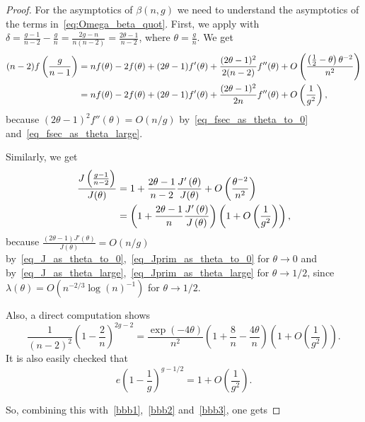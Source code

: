 \documentclass[a4paper,12pt]{article}
\theoremstyle{definition}
\newcommand{\f}[2]{f\left(\frac{#1}{#2}\right)}
\newcommand{\bigO}[1]{O\left({#1}\right)}
\newcommand{\halfminth}{\left(\frac 1 2 -\theta\right)}
\newcommand{\bigpar}[1]{\left({#1}\right)}
\begin{document}
\begin{proof}
For the asymptotics of $\beta(n,g)$ we need to understand the asymptotics of the terms in~\eqref{eq:Omega_beta_quot}. 
First, we apply  with $\delta=\frac{g-1}{n-2}-\frac{g}{n}=\frac{2g-n}{n(n-2)}=\frac{2\theta-1}{n-2}$, where $\theta=\frac{g}{n}$. We get
\begin{align}
(n-2)\f{g}{n-1}&=nf(\theta)-2f(\theta)+(2\theta-1)f'(\theta)+\frac{(2\theta-1)^2}{2(n-2)}f''(\theta)+\bigO{\frac{\halfminth\theta^{-2}}{n^2}}\notag\\
&=nf(\theta)-2f(\theta)+(2\theta-1)f'(\theta)+\frac{(2\theta-1)^2}{2n}f''(\theta)+\bigO{\frac{1}{g^2}},\label{bbb1}
\end{align}
because  $(2\theta-1)^2f''(\theta)=O(n/g)$ by~\eqref{eq_fsec_as_theta_to_0} and~\eqref{eq_fsec_as_theta_large}. 


Similarly, we get
\begin{align}
\frac{J\left(\frac{g-1}{n-2}\right)}{J(\theta)}&=1+\frac{2\theta-1}{n-2}\frac{J'\left(\theta\right)}{J(\theta)}+\bigO{\frac{\theta^{-2}}{n^2}}\notag\\
&=\bigpar{1+\frac{2\theta-1}{n}\frac{J'\left(\theta\right)}{J\left(\theta\right)}}\bigpar{1+\bigO{\frac{1}{g^2}}},\label{bbb2}
\end{align}
because  $\frac{(2\theta-1) J'(\theta)}{J(\theta)}=O(n/g)$ 
by~\eqref{eq_J_as_theta_to_0},~\eqref{eq_Jprim_as_theta_to_0} for $\theta\to 0$ and by~\eqref{eq_J_as_theta_large},~\eqref{eq_Jprim_as_theta_large} for $\theta\to1/2$, since
 $\lambda(\theta)=O(n^{-2/3} \log(n)^{-1})$ for $\theta\to1/2$.


Also, a direct computation shows
\begin{equation}\label{bbb3}
   \frac{1}{(n-2)^2}\left(1-\frac{2}{n}\right)^{2g-2}
   =\frac{\exp(-4\theta)}{n^2}\left(1+\frac{8}{n}-\frac{4\theta}{n}\right)\bigpar{1+\bigO{\frac{1}{g^2}}}.
\end{equation}
It is also easily checked that 
\[
    e\left(1-\frac{1}{g}\right)^{g-1/2} = 1+\bigO{\frac{1}{g^2}}.
\]

So, combining this with~\eqref{bbb1},~\eqref{bbb2} and~\eqref{bbb3}, one gets


\end{proof}
\end{document}
